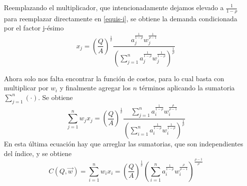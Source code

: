 \begin{ejemplo}
Reemplazando el multiplicador, que intencionadamente dejamos elevado a $\frac{1}{1-\rho}$ para reemplazar directamente en \eqref{equis-i}, se obtiene la demanda condicionada por el factor j-\'esimo
$$x_j = \left( \frac{Q}{A} \right)^{\frac{1}{v}} \frac{a_j^{\frac{1}{1-\rho}} w_j^{\frac{1}{\rho-1}}}{\left( \displaystyle \sum_{j=1}^n a_j^{\frac{1}{1-\rho}} w_j^{\frac{1}{1-\rho}} \right)^{\frac{1}{\rho}}}$$

Ahora solo nos falta encontrar la funci\'on de costos, para lo cual basta con multiplicar por $w_i$ y finalmente agregar los $n$ t\'erminos aplicando la sumatoria $\sum_{j=1}^n (\cdot)$. Se obtiene 
$$\sum_{j=1}^n w_j x_j = \left( \frac{Q}{A} \right)^{\frac{1}{v}} \frac{\displaystyle \sum_{j=1}^n a_i^{\frac{1}{1-\rho}} w_i^{\frac{\rho}{\rho-1}}}{\left( \displaystyle \sum_{i=1}^n a_i^{\frac{1}{1-\rho}} w_i^{\frac{1}{1-\rho}} \right)^{\frac{1}{\rho}}}$$
En esta \'ultima ecuaci\'on hay que arreglar las sumatorias, que son independientes del \'indice, y se obtiene
$$C(Q,\vec{w}) = \sum_{i=1}^n w_i x_i = \left( \frac{Q}{A} \right)^{\frac{1}{v}} \left( \displaystyle \sum_{i=1}^n a_i^{\frac{1}{1-\rho}} w_i^{\frac{\rho}{\rho -1}} \right)^{\frac{\rho -1}{\rho}}$$
\end{ejemplo}

